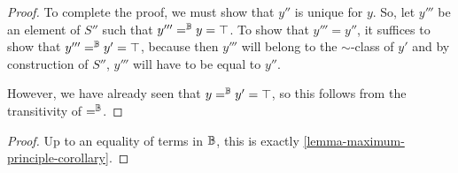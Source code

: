 \documentclass[11pt]{article}
\begin{document}
\begin{proof}
To complete the proof, we must show that $y''$ is unique for $y$. So, let $y'''$ be an element of $S''$ such that $y''' =^{\mathbb{B}} y = \top$. To show that $y''' = y''$, it suffices to show that $y''' =^{\mathbb{B}} y' = \top$, because then $y'''$ will belong to the $\sim$-class of $y'$ and by construction of $S''$, $y'''$ will have to be equal to $y''$.

However, we have already seen that $y =^{\mathbb{B}} y' = \top$, so this follows from the transitivity of $=^{\mathbb{B}}$.

\end{proof}


\begin{proof}
  Up to an equality of terms in $\mathbb{B}$, this is exactly \ref{lemma-maximum-principle-corollary}.
\end{proof}
\end{document}
